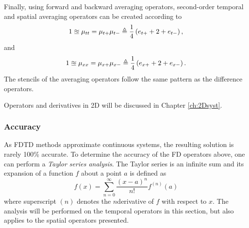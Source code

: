 Finally, using forward and backward averaging operators, second-order temporal and spatial averaging operators can be created according to
\begin{equation}
    1 \approxeq \mu_{tt} = \mu_{t+}\mu_{t-} \triangleq \frac{1}{4}\left(e_{t+}+2+e_{t-}\right),
\end{equation}
and
\begin{equation}
    1 \approxeq \mu_{xx} = \mu_{x+}\mu_{x-} \triangleq \frac{1}{4}\left(e_{x+}+2+e_{x-}\right).
\end{equation}
The stencils of the averaging operators follow the same pattern as the difference operators. 

Operators and derivatives in 2D will be discussed in Chapter \ref{ch:2Dsyst}.


\subsubsection{Accuracy}
As FDTD methods approximate continuous systems, the resulting solution is rarely 100\% accurate. To determine the accuracy of the FD operators above, one can perform a \textit{Taylor series analysis}. The Taylor series is an infinite sum and its expansion of a function $f$ about a point $a$ is defined as
\begin{equation}
    f(x) = \sum_{n=0}^{\infty} \frac{(x-a)^n}{n!}f^{(n)}(a)
\end{equation}
where superscript $(n)$ denotes the $n$\th derivative of $f$ with respect to $x$. The analysis will be performed on the temporal operators in this section, but also applies to the spatial operators presented.

